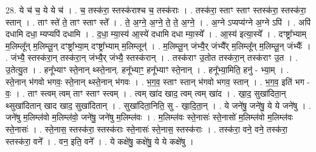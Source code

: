 \documentclass[17pt]{extarticle}
\begin{document}
28. ये च॑ च॒ ये ये च॑ । . च॒ तस्क॑रा॒ स्तस्क॑राश्च च॒ तस्क॑राः । . तस्क॑रा॒ स्ताꣳ स्ताꣳ स्तस्क॑रा॒ स्तस्क॑रा॒ स्तान् । . ताꣳ स्ते॑ ते॒ ताꣳ स्ताꣳ स्ते᳚ । . ते॒ अ॒ग्ने॒ अ॒ग्ने॒ ते॒ ते॒ अ॒ग्ने॒ । . अ॒ग्ने ऽप्यप्य॑ग्ने अ॒ग्ने ऽपि॑ । . अपि॑ दधामि दधा॒ म्यप्यपि॑ दधामि । . द॒धा॒ म्या॒स्य॑ आ॒स्ये॑ दधामि दधा म्या॒स्ये᳚ । . आ॒स्य॑ इत्या॒स्ये᳚ । . दꣳष्ट्रा᳚भ्याम् म॒लिम्लू᳚न् म॒लिम्लू॒न् दꣳष्ट्रा᳚भ्या॒म् दꣳष्ट्रा᳚भ्याम् म॒लिम्लून्॑ । . म॒लिम्लू॒न् जंभ्यै॒र् जंभ्यै᳚र् म॒लिम्लू᳚न् म॒लिम्लू॒न् जंभ्यैः᳚ । . जंभ्यै॒ स्तस्क॑रा॒न् तस्क॑रा॒न् जंभ्यै॒र् जंभ्यै॒ स्तस्क॑रान् । . तस्क॑राꣳ उ॒तोत तस्क॑रा॒न् तस्क॑राꣳ उ॒त । . उ॒तेत्यु॒त । . हनू᳚भ्याꣳ स्ते॒नान् थ्स्ते॒नान्. हनू᳚भ्याꣳ॒॒ हनू᳚भ्याꣳ स्ते॒नान् । . हनू᳚भ्या॒मिति॒ हनु॑ - भ्या॒म् । . स्ते॒नान् भ॑गवो भगवः॒ स्ते॒नान् थ्स्ते॒नान् भ॑गवः । . भ॒ग॒व॒ स्ताꣳ स्तान् भ॑गवो भगव॒ स्तान् । . भ॒ग॒व॒ इति॑ भग - वः॒ । . ताꣳ स्त्वम् त्वम् ताꣳ स्ताꣳ स्त्वम् । . त्वम् खा॑द खाद॒ त्वम् त्वम् खा॑द । . खा॒द॒ सुखा॑दिता॒न् थ्सुखा॑दितान् खाद खाद॒ सुखा॑दितान् । . सुखा॑दिता॒निति॒ सु - खा॒दि॒ता॒न् । . ये जने॑षु॒ जने॑षु॒ ये ये जने॑षु । . जने॑षु म॒लिम्ल॑वो म॒लिम्ल॑वो॒ जने॑षु॒ जने॑षु म॒लिम्ल॑वः । . म॒लिम्ल॑वः स्ते॒नासः॑ स्ते॒नासो॑ म॒लिम्ल॑वो म॒लिम्ल॑वः स्ते॒नासः॑ । . स्ते॒नास॒ स्तस्क॑रा॒ स्तस्क॑राः स्ते॒नासः॑ स्ते॒नास॒ स्तस्क॑राः । . तस्क॑रा॒ वने॒ वने॒ तस्क॑रा॒ स्तस्क॑रा॒ वने᳚ । . वन॒ इति॒ वने᳚ । . ये कक्षे॑षु॒ कक्षे॑षु॒ ये ये कक्षे॑षु । \newline
\end{document}

